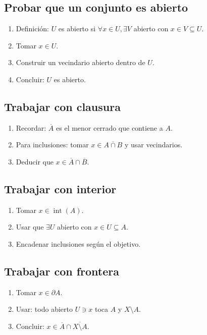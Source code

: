\documentclass[12pt]{article}
\begin{document}
\subsection*{Probar que un conjunto es abierto}
\begin{enumerate}
    \item Definición: $U$ es abierto si $\forall x \in U, \exists V$ abierto con $x \in V \subseteq U$.
    \item Tomar $x \in U$.
    \item Construir un vecindario abierto dentro de $U$.
    \item Concluir: $U$ es abierto.
\end{enumerate}

\subsection*{Trabajar con clausura}
\begin{enumerate}
    \item Recordar: $\overline{A}$ es el menor cerrado que contiene a $A$.
    \item Para inclusiones: tomar $x \in \overline{A \cap B}$ y usar vecindarios.
    \item Deducir que $x \in \overline{A} \cap \overline{B}$.
\end{enumerate}

\subsection*{Trabajar con interior}
\begin{enumerate}
    \item Tomar $x \in \operatorname{int}(A)$.
    \item Usar que $\exists U$ abierto con $x \in U \subseteq A$.
    \item Encadenar inclusiones según el objetivo.
\end{enumerate}

\subsection*{Trabajar con frontera}
\begin{enumerate}
    \item Tomar $x \in \partial A$.
    \item Usar: todo abierto $U \ni x$ toca $A$ y $X \setminus A$.
    \item Concluir: $x \in \overline{A} \cap \overline{X \setminus A}$.
\end{enumerate}
\end{document}

